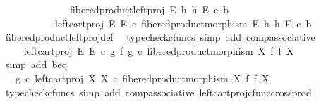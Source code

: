 \begin{isabellebody}
\ \ \ \ \isamarkupfalse%
\ {\isacharminus}{\kern0pt}\isanewline
\ \ \ \ \ \ \isamarkupfalse%
\ {\isachardoublequoteopen}fibered{\isacharunderscore}{\kern0pt}product{\isacharunderscore}{\kern0pt}left{\isacharunderscore}{\kern0pt}proj\ E\ h\ h\ E\ {\isasymcirc}\isactrlsub c\ b\isanewline
\ \ \ \ \ \ \ \ \ \ {\isacharequal}{\kern0pt}\ left{\isacharunderscore}{\kern0pt}cart{\isacharunderscore}{\kern0pt}proj\ E\ E\ {\isasymcirc}\isactrlsub c\ fibered{\isacharunderscore}{\kern0pt}product{\isacharunderscore}{\kern0pt}morphism\ E\ h\ h\ E\ {\isasymcirc}\isactrlsub c\ b{\isachardoublequoteclose}\isanewline
\ \ \ \ \ \ \ \ \isamarkupfalse%
\ fibered{\isacharunderscore}{\kern0pt}product{\isacharunderscore}{\kern0pt}left{\isacharunderscore}{\kern0pt}proj{\isacharunderscore}{\kern0pt}def\ \isamarkupfalse%
\ {\isacharparenleft}{\kern0pt}typecheck{\isacharunderscore}{\kern0pt}cfuncs{\isacharcomma}{\kern0pt}\ simp\ add{\isacharcolon}{\kern0pt}\ comp{\isacharunderscore}{\kern0pt}associative{}{\isacharparenright}{\kern0pt}\isanewline
\ \ \ \ \ \ \isamarkupfalse%
\ \isamarkupfalse%
\ {\isachardoublequoteopen}{\isachardot}{\kern0pt}{\isachardot}{\kern0pt}{\isachardot}{\kern0pt}\ {\isacharequal}{\kern0pt}\ left{\isacharunderscore}{\kern0pt}cart{\isacharunderscore}{\kern0pt}proj\ E\ E\ {\isasymcirc}\isactrlsub c\ {\isacharparenleft}{\kern0pt}g\ {\isasymtimes}\isactrlsub f\ g{\isacharparenright}{\kern0pt}\ {\isasymcirc}\isactrlsub c\ fibered{\isacharunderscore}{\kern0pt}product{\isacharunderscore}{\kern0pt}morphism\ X\ f\ f\ X{\isachardoublequoteclose}\isanewline
\ \ \ \ \ \ \ \ \isamarkupfalse%
\ {\isacharparenleft}{\kern0pt}simp\ add{\isacharcolon}{\kern0pt}\ b{\isacharunderscore}{\kern0pt}eq{\isacharparenright}{\kern0pt}\isanewline
\ \ \ \ \ \ \isamarkupfalse%
\ \isamarkupfalse%
\ {\isachardoublequoteopen}{\isachardot}{\kern0pt}{\isachardot}{\kern0pt}{\isachardot}{\kern0pt}\ {\isacharequal}{\kern0pt}\ g\ {\isasymcirc}\isactrlsub c\ left{\isacharunderscore}{\kern0pt}cart{\isacharunderscore}{\kern0pt}proj\ X\ X\ {\isasymcirc}\isactrlsub c\ fibered{\isacharunderscore}{\kern0pt}product{\isacharunderscore}{\kern0pt}morphism\ X\ f\ f\ X{\isachardoublequoteclose}\isanewline
\ \ \ \ \ \ \ \ \isamarkupfalse%
\ {\isacharparenleft}{\kern0pt}typecheck{\isacharunderscore}{\kern0pt}cfuncs{\isacharcomma}{\kern0pt}\ simp\ add{\isacharcolon}{\kern0pt}\ comp{\isacharunderscore}{\kern0pt}associative{}\ left{\isacharunderscore}{\kern0pt}cart{\isacharunderscore}{\kern0pt}proj{\isacharunderscore}{\kern0pt}cfunc{\isacharunderscore}{\kern0pt}cross{\isacharunderscore}{\kern0pt}prod{\isacharparenright}{\kern0pt}\isanewline

\end{isabellebody}
